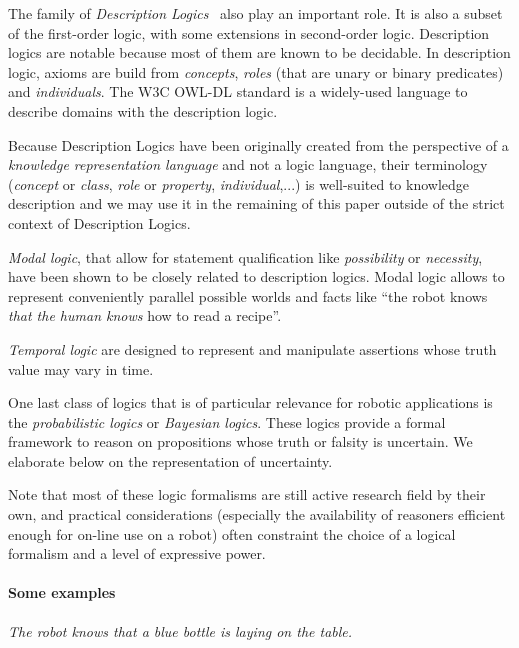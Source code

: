 \documentclass[a4paper, twocolumn]{article}
\begin{document}
The family of \emph{Description Logics}~\cite{Baader2008} also play an
important role. It is also a subset of the first-order logic, with some
extensions in second-order logic. Description logics are notable because most
of them are known to be decidable. In description logic, axioms are build from
\emph{concepts}, \emph{roles} (that are unary or binary predicates) and
\emph{individuals}. The W3C OWL-DL standard is a widely-used language to
describe domains with the description logic.

Because Description Logics have been originally created from the perspective of
a \emph{knowledge representation language} and not a logic language, their
terminology (\emph{concept} or \emph{class}, \emph{role} or \emph{property},
\emph{individual},...) is well-suited to knowledge description and we may use
it in the remaining of this paper outside of the strict context of  Description
Logics.

\emph{Modal logic}, that allow for statement qualification like
\emph{possibility} or \emph{necessity}, have been shown to be closely related
to description logics. Modal logic allows to represent conveniently parallel
possible worlds and facts like ``the robot knows \emph{that the human knows}
how to read a recipe''.


\emph{Temporal logic} are designed to represent and manipulate assertions whose
truth value may vary in time.

One last class of logics that is of particular relevance for robotic
applications is the \emph{probabilistic logics} or \emph{Bayesian logics}.
These logics provide a formal framework to reason on propositions whose truth
or falsity is uncertain. We elaborate below on the representation of uncertainty.

Note that most of these logic formalisms are still active research field by
their own, and practical considerations (especially the availability of
reasoners efficient enough for on-line use on a robot) often constraint the
choice of a logical formalism and a level of expressive power.


\paragraph{Some examples}

\emph{The robot knows that a blue bottle is laying on the table.}
\end{document}
